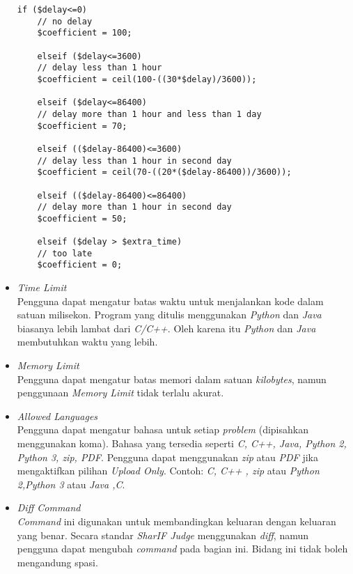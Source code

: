 \begin{itemize}
	\begin{lstlisting}[basicstyle=\ttfamily, frame=single,
	columns=fullflexible, keepspaces=true, breaklines=true, label=ls:7]
	if ($delay<=0)
	// no delay
	$coefficient = 100;
	
	elseif ($delay<=3600)
	// delay less than 1 hour
	$coefficient = ceil(100-((30*$delay)/3600));
	
	elseif ($delay<=86400)
	// delay more than 1 hour and less than 1 day
	$coefficient = 70;
	
	elseif (($delay-86400)<=3600)
	// delay less than 1 hour in second day
	$coefficient = ceil(70-((20*($delay-86400))/3600));
	
	elseif (($delay-86400)<=86400)
	// delay more than 1 hour in second day
	$coefficient = 50;
	
	elseif ($delay > $extra_time)
	// too late
	$coefficient = 0;
	\end{lstlisting}
	
	\item \textit{Time Limit} \\
	Pengguna dapat mengatur batas waktu untuk menjalankan kode dalam satuan milisekon. Program yang ditulis menggunakan \textit{Python} dan \textit{Java} biasanya lebih lambat dari \textit{C/C++}. Oleh karena itu \textit{Python} dan \textit{Java} membutuhkan waktu yang lebih.
	
	\item \textit{Memory Limit} \\
	Pengguna dapat mengatur batas memori dalam satuan \textit{kilobytes}, namun penggunaan \textit{Memory Limit} tidak terlalu akurat.
	
	\item \textit{Allowed Languages} \\
	Pengguna dapat mengatur bahasa untuk setiap \textit{problem} (dipisahkan menggunakan koma). Bahasa yang tersedia seperti \textit{C, C++, Java, Python 2, Python 3, zip, PDF}. Pengguna dapat menggunakan \textit{zip} atau \textit{PDF} jika mengaktifkan pilihan \textit{Upload Only}. Contoh: \textit{C, C++ , zip} atau \textit{Python 2,Python 3} atau \textit{Java ,C}.
	
	\item \textit{Diff Command} \\
	\textit{Command} ini digunakan untuk membandingkan keluaran dengan keluaran yang benar. Secara standar \textit{SharIF Judge} menggunakan \textit{diff}, namun pengguna dapat mengubah \textit{command} pada bagian ini. Bidang ini tidak boleh mengandung spasi.
	

\end{itemize}
